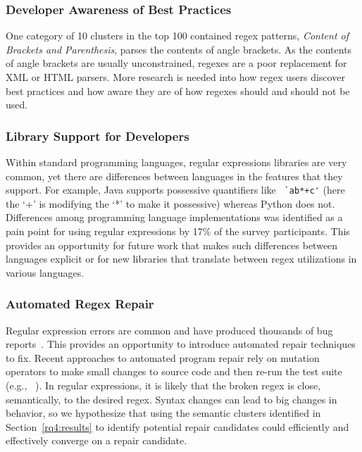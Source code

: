 \subsubsection{Developer Awareness of Best Practices}
One category of 10 clusters in the top 100 contained regex patterns, \emph{Content of Brackets and Parenthesis}, parses the contents of angle brackets.  As the contents of angle brackets are usually unconstrained, regexes are a poor replacement for XML or HTML parsers.  More research is needed into how regex users discover best practices and how aware they are of how regexes should and should not be used.

\subsubsection{Library Support for Developers}
Within standard programming languages, regular expressions libraries are very common, yet there are  differences between languages in the features that they support. For example, Java supports possessive quantifiers like \verb! `ab*+c'! (here the `+' is modifying the `*' to make it possessive) whereas Python does not. Differences among programming language implementations was identified as a pain point for using regular expressions by 17\% of the survey participants. This provides an opportunity for future work that makes such differences between languages explicit or for new libraries that translate between regex utilizations in various languages.


\subsubsection{Automated Regex Repair}
Regular expression errors are common and have produced thousands of bug reports~\cite{Spishak:2012:TSR:2318202.2318207}. This provides an opportunity to introduce automated repair techniques to fix.
Recent approaches to automated program repair rely on mutation operators to make small changes to source code and then re-run the test suite (e.g., ~\cite{cacm10, genprog-tse-journal}). In regular expressions, it is likely that the broken regex is close, semantically, to the desired regex. Syntax changes can lead to big changes in behavior, so we hypothesize that using the semantic clusters identified in Section~\ref{rq4:results} to identify potential repair candidates could efficiently and effectively converge on a repair candidate.



